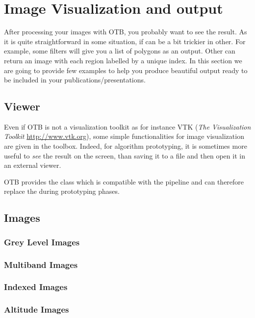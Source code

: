 \chapter{Image Visualization and output}
\label{chap:ImageVisualization}

After processing your images with OTB, you probably want to see the result. As it is quite straightforward in some situation, if can be a bit trickier in other. For example, some filters will give you a list of polygons as an output. Other can return an image with each region labelled by a unique index. In this section we are going to provide few examples to help you produce beautiful output ready to be included in your publications/presentations.


\section{Viewer}
Even if OTB is not a visualization toolkit as for instance VTK
(\emph{The Visualization Toolkit} \url{http://www.vtk.org}), some
simple functionalities for image visualization are given in the
toolbox. Indeed, for algorithm prototyping, it is sometimes more
useful to \emph{see} the result on the screen, than saving it to a
file and then open it in an external viewer.

OTB provides the  class which is compatible
with the pipeline and can therefore replace the
 during prototyping phases.




\section{Images}

\subsection{Grey Level Images}
\label{sec:ViewingGreyLevelImages}



\subsection{Multiband Images}
\label{sec:ViewingMultibandImages}



\subsection{Indexed Images}
\label{sec:ViewingIndexedImages}



\subsection{Altitude Images}
\label{sec:ViewingAltitudeImages}




